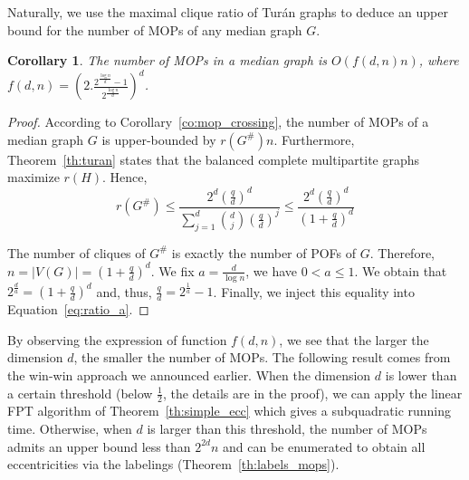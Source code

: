 \documentclass{article}
\newtheorem{corollary}{Corollary}
\newcommand{\card}[1]{\left| #1 \right|}
\begin{document}
Naturally, we use the maximal clique ratio of Tur\'an graphs to deduce an upper bound for the number of MOPs of any median graph $G$.

\begin{corollary}
The number of MOPs in a median graph is $O(f(d,n)n)$, where $f(d,n) = \left(2.\frac{2^{\frac{\log n}{d}}-1}{2^{\frac{\log n}{d}}}\right)^d$.
\label{co:number_mops}
\end{corollary}
\begin{proof}
According to Corollary~\ref{co:mop_crossing}, the number of MOPs of a median graph $G$ is upper-bounded by $r(G^{\#})n$. Furthermore, Theorem~\ref{th:turan} states that the balanced complete multipartite graphs maximize $r(H)$. Hence,
\begin{equation}
    r(G^{\#})\le \frac{2^d(\frac{q}{d})^d}{\sum_{j=1}^d \binom{d}{j}(\frac{q}{d})^j} \le \frac{2^d(\frac{q}{d})^d}{(1+\frac{q}{d})^d}
    \label{eq:ratio_a}
\end{equation}

The number of cliques of $G^{\#}$ is exactly the number of POFs of $G$. Therefore, $n = \card{V(G)} = (1+\frac{q}{d})^d$. We fix $a = \frac{d}{\log n}$, we have $0 < a \le 1$. We obtain that $2^{\frac{d}{a}} = (1+\frac{q}{d})^d$ and, thus, $\frac{q}{d} = 2^{\frac{1}{a}} - 1$. Finally, we inject this equality into Equation~\eqref{eq:ratio_a}.
\end{proof}

By observing the expression of function $f(d,n)$, we see that the larger the dimension $d$, the smaller the number of MOPs. The following result comes from the win-win approach we announced earlier. When the dimension $d$ is lower than a certain threshold (below $\frac{1}{2}$, the details are in the proof), we can apply the linear FPT algorithm of Theorem~\ref{th:simple_ecc} which gives a subquadratic running time. Otherwise, when $d$ is larger than this threshold, the number of MOPs admits an upper bound less than $2^{2d}n$ and can be enumerated to obtain all eccentricities via the labelings (Theorem~\ref{th:labels_mops}).
\end{document}
